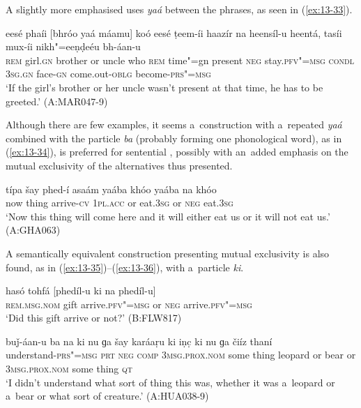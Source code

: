  A slightly more emphasised  uses \textit{yaá} between the phrases, as seen in (\ref{ex:13-33}).

\begin{exe}
\ex
\label{ex:13-33}
\gll eesé phaíi [bhróo yaá máamu] koó eesé ṭeem-íi haazír na heensíl-u heentá, tasíi mux-íi nikh"=eeṇḍeéu bh-áan-u \\
\textsc{rem} girl.\textsc{gn} brother or uncle who \textsc{rem} time"=gn  present \textsc{neg} stay.\textsc{pfv"=msg} \textsc{condl} \textsc{3sg.gn} face-\textsc{gn}  come.out-\textsc{oblg} become-\textsc{prs"=msg}  \\
\glt `If the girl's brother or her uncle wasn't present at that time, he has to be greeted.' (A:MAR047-9) 
\end{exe}

 Although there are few examples, it seems a~construction with a~repeated \textit{yaá} combined with the particle \textit{ba} (probably forming one phonological word), as in (\ref{ex:13-34}), is preferred for sentential , possibly with an~added emphasis on the mutual exclusivity of the alternatives thus presented. 

\begin{exe}
\ex
\label{ex:13-34}
\gll típa šay phed-í asaám yaába khóo yaába na khóo \\
now thing arrive-\textsc{cv} \textsc{1pl.acc} or eat.\textsc{3sg} or \textsc{neg} eat.\textsc{3sg} \\
\glt `Now this thing will come here and it will either eat us or it will not eat us.' (A:GHA063) 
\end{exe}

 A semantically equivalent construction presenting mutual exclusivity is also found, as in (\ref{ex:13-35})--(\ref{ex:13-36}), with a~particle \textit{ki}. 

\begin{exe}
\ex
\label{ex:13-35}
\gll hasó tohfá [phedíl-u ki na phedíl-u] \\
\textsc{rem.msg.nom} gift arrive.\textsc{pfv"=msg} or \textsc{neg}  arrive.\textsc{pfv"=msg} \\
\glt `Did this gift arrive or not?' (B:FLW817)

\ex
\label{ex:13-36}
\gll buǰ-áan-u ba na ki nu ɡa šay karáaṛu ki iṇc̣ ki nu ɡa čiíz thaní \\
understand-\textsc{prs"=msg} \textsc{prt} \textsc{neg} \textsc{comp} \textsc{3msg.prox.nom}  some thing leopard or bear or \textsc{3msg.prox.nom} some thing \textsc{qt} \\
\glt `I didn't understand what sort of thing this was, whether it was a~leopard or a~bear or what sort of creature.' (A:HUA038-9) 
\end{exe}


